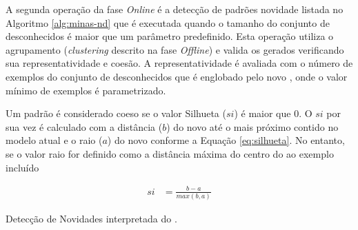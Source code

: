 A segunda operação da fase \emph{Online} é a detecção de padrões novidade
listada no Algoritmo \ref{alg:minas-nd} que é executada quando o tamanho do
conjunto de desconhecidos é maior que um parâmetro predefinido.
Esta operação utiliza o agrupamento (\emph{clustering} descrito na fase
\emph{Offline}) e valida os \mclusters gerados verificando sua
representatividade e coesão.
A representatividade é avaliada com o número de exemplos do conjunto de
desconhecidos que é englobado pelo novo \mcluster, onde o valor mínimo de
exemplos é parametrizado.

Um padrão é considerado coeso se o valor Silhueta ($si$) é maior que $0$.
O $si$ por sua vez é calculado com a distância ($b$) do novo \mcluster até o
mais próximo contido no modelo atual e o raio ($a$) do novo \mcluster
conforme a Equação \ref{eq:silhueta}.
No entanto, se o valor raio for definido como a distância máxima do centro do
\mcluster ao exemplo incluído

\begin{align}
  \mathit{si} &= \frac{b - a}{max(b, a)} \label{eq:silhueta}
\end{align}


\begin{algorithm}[htb]
  \KwParams{\minExamplesPerCluster, \noveltyFactor}
  \caption{Detecção de Novidades interpretada do \minas \cite{Faria2016minas}.}
  \label{alg:minas-nd}
\end{algorithm}

